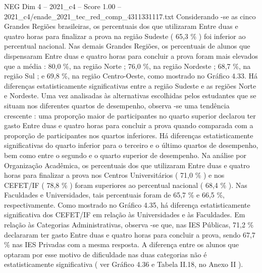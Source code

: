 \begin{textsample}{NEG Dim 4 – 2021\_c4 – Score 1.00 – 2021\_c4/enade\_2021\_tec\_red\_comp\_4311331117.txt}
Considerando -se as cinco Grandes Regiões brasileiras, os percentuais dos que utilizaram Entre duas e quatro horas para finalizar a prova na região Sudeste ( 65,3 \% ) foi inferior ao percentual nacional.
Nas demais Grandes Regiões, os percentuais de alunos que dispensaram Entre duas e quatro horas para concluir a prova foram mais elevados que a média : 80,0 \%, na região Norte ; 76,0 \%, na região Nordeste ; 68,7 \%, na região Sul ; e 69,8 \%, na região Centro-Oeste, como mostrado no Gráfico 4.33.
Há diferenças estatisticamente significativas entre a região Sudeste e as regiões Norte e Nordeste.
Uma vez analisadas às alternativas escolhidas pelos estudantes que se situam nos diferentes quartos de desempenho, observa -se uma tendência crescente : uma proporção maior de participantes no quarto superior declarou ter gasto Entre duas e quatro horas para concluir a prova quando comparada com a proporção de participantes nos quartos inferiores.
Há diferenças estatisticamente significativas do quarto inferior para o terceiro e o último quartos de desempenho, bem como entre o segundo e o quarto superior de desempenho.
Na análise por Organização Acadêmica, os percentuais dos que utilizaram Entre duas e quatro horas para finalizar a prova nos Centros Universitários ( 71,0 \% ) e nos CEFET/IF ( 78,8 \% ) foram superiores ao percentual nacional ( 68,4 \% ).
Nas Faculdades e Universidades, tais percentuais foram de 65,7 \% e 66,5 \%, respectivamente.
Como mostrado no Gráfico 4.35, há diferença estatisticamente significativa dos CEFET/IF em relação às Universidades e às Faculdades.
Em relação às Categorias Administrativas, observa -se que, nas IES Públicas, 71,2 \% declararam ter gasto Entre duas e quatro horas para concluir a prova, sendo 67,7 \% nas IES Privadas com a mesma resposta.
A diferença entre os alunos que optaram por esse motivo de dificuldade nas duas categorias não é estatisticamente significativa ( ver Gráfico 4.36 e Tabela II.18, no Anexo II ).

\end{textsample}
